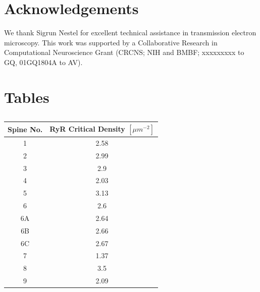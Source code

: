 \documentclass[fleqn,10pt]{wlscirep}
\begin{document}
\nocite{*}


\section*{Acknowledgements}

We thank Sigrun Nestel for excellent technical assistance in transmission electron microscopy. This work was supported by a Collaborative Research in Computational Neuroscience Grant (CRCNS; NIH and BMBF; xxxxxxxxx to GQ, 01GQ1804A to AV).
\clearpage
\section*{Tables}
\begin{table}[h!]
    \centering
    \begin{tabular}{|c|c|}
    \hline
        \textbf{Spine No.} & \textbf{RyR Critical Density $[\mu m^{-2}]$} \\ \hline
        1 & 2.58 \\ 
        2 &2.99 \\ 
        3 &2.9 \\ 
        4&2.03 \\ 
        5&3.13 \\ 
        6&2.6 \\ 
        6A&2.64 \\ 
        6B&2.66 \\ 
        6C&2.67 \\ 
        7&1.37 \\ 
        8&3.5 \\ 
        9&2.09 \\ \hline
    \end{tabular}
    \caption{}
\end{table}
\end{document}

